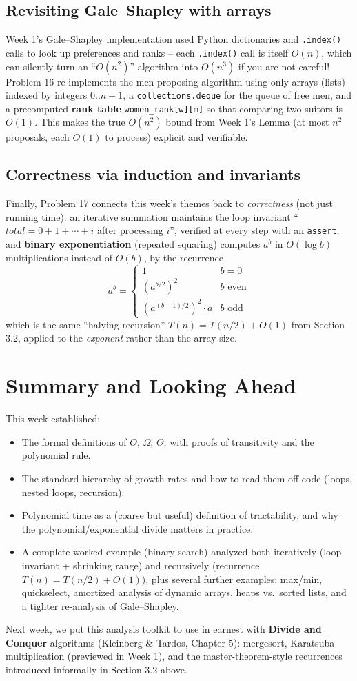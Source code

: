 \documentclass[11pt]{article}
\begin{document}
\subsection{Revisiting Gale--Shapley with arrays}

Week 1's Gale--Shapley implementation used Python dictionaries and \texttt{.index()} calls
to look up preferences and ranks -- each \texttt{.index()} call is itself $O(n)$, which can
silently turn an ``$O(n^2)$'' algorithm into $O(n^3)$ if you are not careful! Problem 16
re-implements the men-proposing algorithm using only arrays (lists) indexed by integers
$0..n-1$, a \texttt{collections.deque} for the queue of free men, and a precomputed
\textbf{rank table} \texttt{women\_rank[w][m]} so that comparing two suitors is $O(1)$.
This makes the true $O(n^2)$ bound from Week 1's Lemma (at most $n^2$ proposals, each
$O(1)$ to process) explicit and verifiable.

\subsection{Correctness via induction and invariants}

Finally, Problem 17 connects this week's themes back to \emph{correctness} (not just
running time): an iterative summation maintains the loop invariant ``$total =
0+1+\cdots+i$ after processing $i$'', verified at every step with an \texttt{assert}; and
\textbf{binary exponentiation} (repeated squaring) computes $a^b$ in $O(\log b)$
multiplications instead of $O(b)$, by the recurrence
\[
  a^b = \begin{cases}
    1 & b = 0 \\
    (a^{b/2})^2 & b \text{ even} \\
    (a^{(b-1)/2})^2 \cdot a & b \text{ odd}
  \end{cases}
\]
which is the same ``halving recursion'' $T(n) = T(n/2) + O(1)$ from Section 3.2, applied to
the \emph{exponent} rather than the array size.

\section{Summary and Looking Ahead}

This week established:
\begin{itemize}
    \item The formal definitions of $O$, $\Omega$, $\Theta$, with proofs of transitivity
    and the polynomial rule.
    \item The standard hierarchy of growth rates and how to read them off code (loops,
    nested loops, recursion).
    \item Polynomial time as a (coarse but useful) definition of tractability, and why the
    polynomial/exponential divide matters in practice.
    \item A complete worked example (binary search) analyzed both iteratively (loop
    invariant + shrinking range) and recursively (recurrence $T(n) = T(n/2) + O(1)$), plus
    several further examples: max/min, quickselect, amortized analysis of dynamic arrays,
    heaps vs.\ sorted lists, and a tighter re-analysis of Gale--Shapley.
\end{itemize}

Next week, we put this analysis toolkit to use in earnest with \textbf{Divide and Conquer}
algorithms (Kleinberg \& Tardos, Chapter 5): mergesort, Karatsuba multiplication (previewed
in Week 1), and the master-theorem-style recurrences introduced informally in Section 3.2
above.
\end{document}
